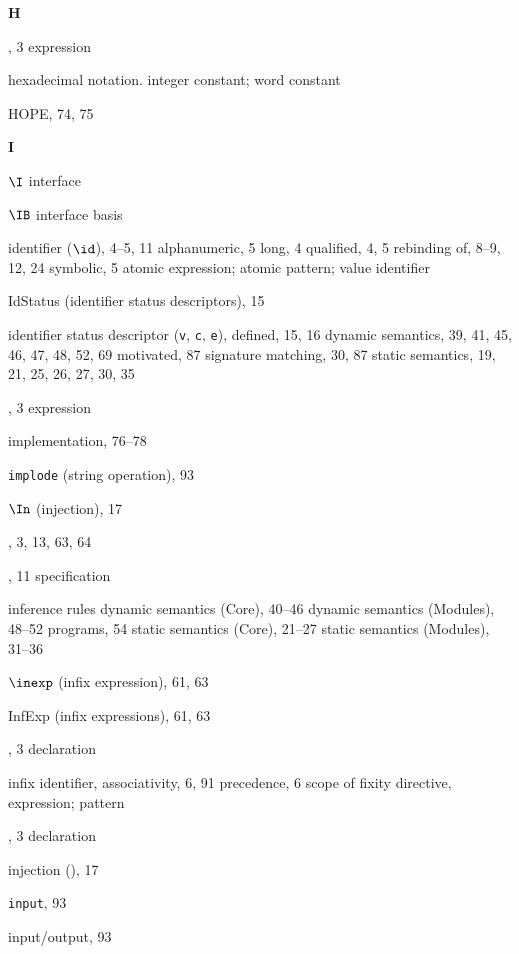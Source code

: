 \begin{theindex}
\indexspace
\parbox{65mm}{\hfil{\large\bf H}\hfil}
\indexspace
\item \HANDLE, 3
\subitem \seealso expression
\item hexadecimal notation. \see integer constant; word constant
\item HOPE, 74, 75
\indexspace
\parbox{65mm}{\hfil{\large\bf I}\hfil}
\indexspace
\item $\I$ \see interface
\item $\IB$ \see interface basis
\item identifier ($\id$), 4--5, 11
\subitem alphanumeric, 5
\subitem long, 4
\subitem qualified, 4, 5
\subitem rebinding of, 8--9, 12, 24
\subitem symbolic, 5
\subitem \seealso  atomic expression; atomic pattern; value identifier
\item IdStatus (identifier status descriptors), 15
\item identifier status descriptor ({\tt v}, {\tt c}, {\tt e}),
\subitem defined, 15, 16
\subitem dynamic semantics, 39, 41, 45, 46, 47, 48, 52, 69
\subitem motivated, 87
\subitem signature matching, 30, 87
\subitem static semantics, 19, 21, 25, 26, 27, 30, 35
\item \IF, 3
\subitem \seealso expression
\item implementation, 76--78
\item {\tt implode} (string operation), 93
\item $\In$ (injection), 17
\item \IN, 3, 13, 63, 64
\item \INCLUDE, 11
\subitem \seealso specification
\item inference rules
\subitem dynamic semantics (Core), 40--46
\subitem dynamic semantics (Modules), 48--52
\subitem programs, 54
\subitem static semantics (Core), 21--27
\subitem static semantics (Modules), 31--36
\item $\inexp$ (infix expression), 61, 63
\item InfExp (infix expressions), 61, 63
\item \INFIX, 3
\subitem \seealso declaration
\item infix identifier, \infixapplrefs
\subitem associativity, 6, 91
\subitem precedence, 6
\subitem scope of fixity directive, \scopefixityrefs
\subitem \seealso expression; pattern
\item \INFIXR, 3
\subitem \seealso declaration
\item injection (\In), 17
\item {\tt input}, 93
\item input/output, 93

\end{theindex}
